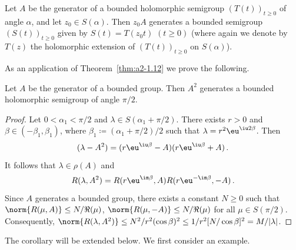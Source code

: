 \begin{remark*}\label{rem:a2-1.6-kgk}
Let $A$ be the generator of a bounded holomorphic semigroup $(T(t))_{t \geq 0}$ 
of angle $\alpha$, and let $z_{0} \in S(\alpha)$.
Then $z_{0}A$ generates a bounded semigroup 
$(S(t))_{t \geq 0}$ given by $S(t) = T(z_{0}t)$  $(t \geq 0)$ (where again we denote by $T(z)$ the holomorphic extension of\/ $(T(t))_{t \geq 0}$ on $S(\alpha)$).
\end{remark*}
As an application of Theorem~\ref{thm:a2-1.12}  we prove the following.
\begin{corollary}\label{cor:a2-1.13}
Let $A$ be the generator of a bounded group.
Then $A^{2}$ generates a bounded holomorphic semigroup of angle $\pi/2$.
\end{corollary}
\begin{proof}
Let $0 < \alpha_{1} < \pi/2$ and $\lambda \in S(\alpha_{1} + \pi/2)$.
There exists $r > 0$ and $\beta \in (-\beta_{1},\beta_{1})$,
where $\beta_{1} \coloneqq (\alpha_{1} + \pi/2)/2$
such that $\lambda = r^{2}\eu^{\iu 2\beta}$.
Then 
\[
(\lambda - A^{2}) = (r\eu^{\iu\beta} - A)(r\eu^{\iu\beta} + A) \, .
\] 
It follows that $\lambda \in \rho(A)$ and 
\begin{equation}\label{eq:a2-1.7}
    R(\lambda,A^{2}) = R(r\eu^{\im\beta},A)R(r\eu^{-\im\beta},-A) \, .
\end{equation}
Since $A$ generates a bounded group, there exists a constant $N \geq 0$ such that \\ 
$\norm{R(\mu,A)} \leq N/\Re(\mu)$, $\norm{R(\mu,-A)} \leq N/\Re(\mu)$ for all $\mu \in S(\pi/2)$.
Consequently, $\norm{R(\lambda,A^{2})} \leq N^{2}/r^{2}(\cos\beta)^{2} \leq 1/r^{2}[N/\cos\beta]^{2} = M/|\lambda|$.
\end{proof}
The corollary will be extended below.
We first consider an example.
